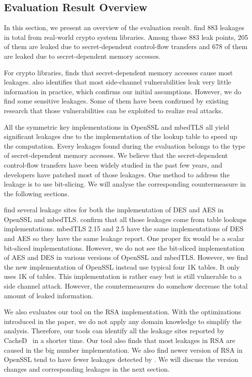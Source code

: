 \subsection{Evaluation Result Overview}
In this section, we present an overview of the evaluation result. 
\tool{} find 883 leakages in total from real-world crypto system libraries.
Among those 883 leak points, 205 of them are leaked due
to secret-dependent control-flow transfers and 678 of them are leaked 
due to secret-dependent memory accesses. 

For crypto libraries, \tool{} finds that secret-dependent memory accesses 
cause most leakages. 
\tool{} also identifies that most side-channel vulnerabilities 
leak very little information in practice, which confirms our initial
assumptions. 
However, we do find some sensitive leakages. 
Some of them have been confirmed by existing research that those 
vulnerabilities can be exploited to realize real attacks. 

All the symmetric key implementations in OpenSSL and mbedTLS all yield
significant leakages due to the implementation of the lookup table
to speed up the computation. Every leakages found during the evaluation
belongs to the type of secret-dependent memory accesses. We believe that
the secret-dependent control-flow transfers have been widely studied in
the past few years, and developers have patched most of those leakages. 
One method to address the leakage is to use bit-slicing. We will analyse
the corresponding countermeasure in the following sections.

\tool{} find several leakage sites for both the implementation of DES and AES
in OpenSSL and mbedTLS. \tool{} confirm that all those leakages come from
table lookups implementations. mbedTLS 2.15 and 2.5 have the same implementations
of DES and AES so they have the same leakage report. One proper fix would be 
a scalar bit-sliced implementations. However, we do not see the bit-sliced 
implementation of AES and DES in various versions of OpenSSL and mbedTLS.  
However, we find the new implementation of OpenSSL instead use typical four 1K
tables. It only uses 1K of tables. This implementation is rather easy but is
still vulnerable to a side channel attack. However, the countermeasures do
somehow decrease the total amount of leaked information.

We also evaluates our tool on the RSA implementation. With the optimizations
introduced in the paper, we do not apply any domain knowledge to 
simplify the analysis. Therefore, our tools can identify all the leakage 
sites reported by CacheD~\cite{203878} in a shorter time. Our tool
also finds that most leakages in RSA are caused in the big number implementation.
We also find newer version of RSA in OpenSSL tend to have fewer leakages detected
by \tool{}. We will discuss the version changes and corresponding leakages 
in the next section.

